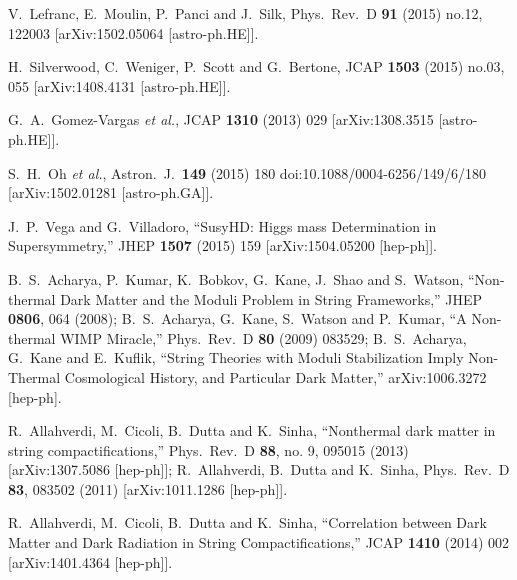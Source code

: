 \documentclass[11pt,a4paper]{article}
\begin{document}
\begin{thebibliography}{9}
  
  V.~Lefranc, E.~Moulin, P.~Panci and J.~Silk,
  Phys.\ Rev.\ D {\bf 91} (2015) no.12,  122003
  [arXiv:1502.05064 [astro-ph.HE]].
  
  H.~Silverwood, C.~Weniger, P.~Scott and G.~Bertone,
  JCAP {\bf 1503} (2015) no.03,  055
  [arXiv:1408.4131 [astro-ph.HE]].
  
  
  G.~A.~Gomez-Vargas {\it et al.},
  JCAP {\bf 1310} (2013) 029
  [arXiv:1308.3515 [astro-ph.HE]].
  
  S.~H.~Oh {\it et al.},
  Astron.\ J.\  {\bf 149} (2015) 180
  doi:10.1088/0004-6256/149/6/180
  [arXiv:1502.01281 [astro-ph.GA]].
	
  J.~P.~Vega and G.~Villadoro,
  ``SusyHD: Higgs mass Determination in Supersymmetry,''
  JHEP {\bf 1507} (2015) 159
  [arXiv:1504.05200 [hep-ph]].
   
  
B.~S.~Acharya, P.~Kumar, K.~Bobkov, G.~Kane, J.~Shao and S.~Watson,
  ``Non-thermal Dark Matter and the Moduli Problem in String Frameworks,''
  JHEP {\bf 0806}, 064 (2008);
B.~S.~Acharya, G.~Kane, S.~Watson and P.~Kumar,
  ``A Non-thermal WIMP Miracle,''
  Phys.\ Rev.\ D {\bf 80} (2009) 083529;
B.~S.~Acharya, G.~Kane and E.~Kuflik,
  ``String Theories with Moduli Stabilization Imply Non-Thermal Cosmological History, and Particular Dark Matter,''
  arXiv:1006.3272 [hep-ph].

R.~Allahverdi, M.~Cicoli, B.~Dutta and K.~Sinha,
  ``Nonthermal dark matter in string compactifications,''
  Phys.\ Rev.\ D {\bf 88}, no. 9, 095015 (2013)
  [arXiv:1307.5086 [hep-ph]];
  R.~Allahverdi, B.~Dutta and K.~Sinha,
  Phys.\ Rev.\ D {\bf 83}, 083502 (2011)
  [arXiv:1011.1286 [hep-ph]]. 

  R.~Allahverdi, M.~Cicoli, B.~Dutta and K.~Sinha,
  ``Correlation between Dark Matter and Dark Radiation in String Compactifications,''
  JCAP {\bf 1410} (2014) 002
  [arXiv:1401.4364 [hep-ph]].


\end{thebibliography}
\end{document}
